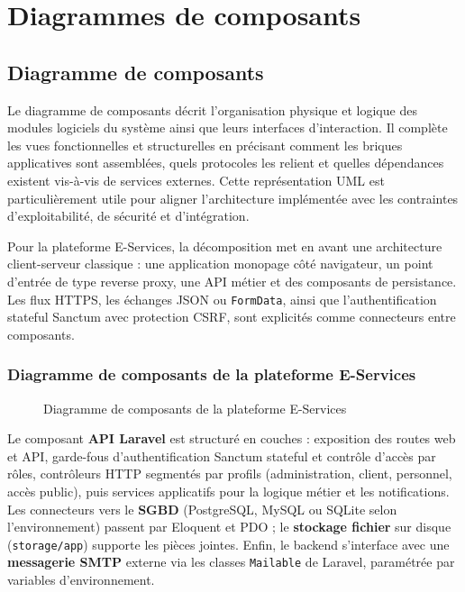 \newpage
\section{Diagrammes de composants}

\subsection{Diagramme de composants}

Le diagramme de composants décrit l'organisation physique et logique des modules logiciels du système ainsi que leurs interfaces d'interaction. Il complète les vues fonctionnelles et structurelles en précisant comment les briques applicatives sont assemblées, quels protocoles les relient et quelles dépendances existent vis-à-vis de services externes. Cette représentation UML est particulièrement utile pour aligner l'architecture implémentée avec les contraintes d'exploitabilité, de sécurité et d'intégration.

Pour la plateforme E-Services, la décomposition met en avant une architecture client-serveur classique : une application monopage côté navigateur, un point d'entrée de type reverse proxy, une API métier et des composants de persistance. Les flux HTTPS, les échanges JSON ou \texttt{FormData}, ainsi que l'authentification stateful Sanctum avec protection CSRF, sont explicités comme connecteurs entre composants.

\newpage
\subsubsection{Diagramme de composants de la plateforme E-Services}

\begin{figure}[H]
  \centering
  
  \caption{Diagramme de composants de la plateforme E-Services}
  \label{fig:dcomp_plateforme}
\end{figure}

Le composant \textbf{API Laravel} est structuré en couches : exposition des routes web et API, garde-fous d'authentification Sanctum stateful et contrôle d'accès par rôles, contrôleurs HTTP segmentés par profils (administration, client, personnel, accès public), puis services applicatifs pour la logique métier et les notifications. Les connecteurs vers le \textbf{SGBD} (PostgreSQL, MySQL ou SQLite selon l'environnement) passent par Eloquent et PDO ; le \textbf{stockage fichier} sur disque (\texttt{storage/app}) supporte les pièces jointes. Enfin, le backend s'interface avec une \textbf{messagerie SMTP} externe via les classes \texttt{Mailable} de Laravel, paramétrée par variables d'environnement.

